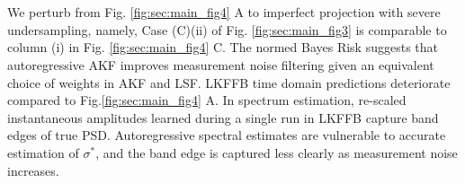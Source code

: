 \\
\\
We perturb from Fig. \ref{fig:sec:main_fig4} A to imperfect projection with severe undersampling, namely, Case (C)(ii) of Fig. \ref{fig:sec:main_fig3} is comparable to column (i) in Fig. \ref{fig:sec:main_fig4} C. The normed Bayes Risk suggests that autoregressive AKF improves measurement noise filtering given an equivalent choice of weights in AKF and LSF. LKFFB time domain predictions deteriorate compared to Fig.\ref{fig:sec:main_fig4} A. In spectrum estimation, re-scaled instantaneous amplitudes learned during a single run in LKFFB capture band edges of true PSD. Autoregressive spectral estimates are vulnerable to accurate estimation of $\sigma^*$, and the band edge is captured less clearly as measurement noise increases.
\\
\\
\onecolumngrid
\FloatBarrier
\twocolumngrid

